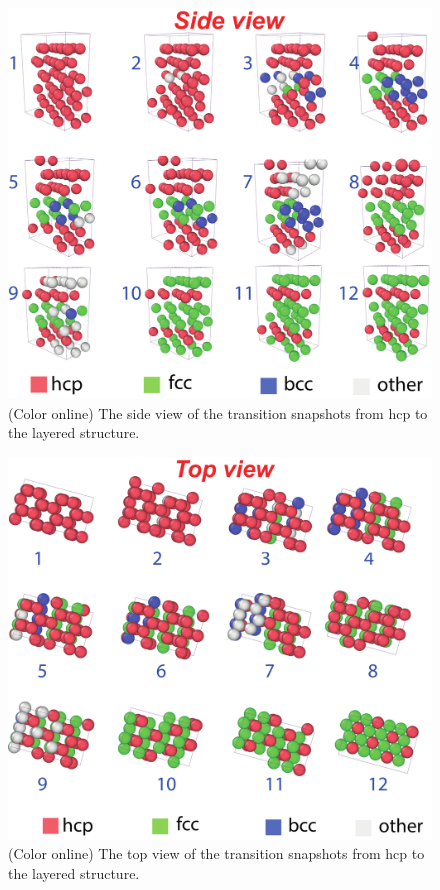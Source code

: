 \documentclass[preprint,12pt]{elsarticle}
\begin{document}
\begin{figure}[!t]
 \begin{center}
 \includegraphics[scale=0.3]{argon.pdf}
  \caption{(Color online) The side view of the transition snapshots from hcp to the layered structure.}
  \label{fig:paths_argon}
 \end{center}
\end{figure}

\begin{figure}[!t]
 \begin{center}
 \includegraphics[scale=0.3]{argon_top.pdf}
  \caption{(Color online) The top view of the transition snapshots from hcp to the layered structure.}
  \label{fig:paths_argon_top}
 \end{center}
\end{figure}
\end{document}
